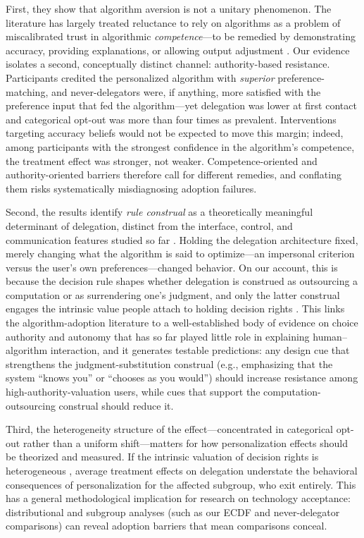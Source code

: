 \documentclass[a4paper, 12pt, fleqn]{article}
\theoremstyle{definition}
\newcommand{\inew}[1]{{\color{blue} #1\color{black}}}
\begin{document}
\inew{First, they show that algorithm aversion is not a unitary phenomenon. The literature has largely treated reluctance to rely on algorithms as a problem of miscalibrated trust in algorithmic \emph{competence}---to be remedied by demonstrating accuracy, providing explanations, or allowing output adjustment \citep{Dietvorst2018,Yeomans2019,Leichtmann2023}. Our evidence isolates a second, conceptually distinct channel: authority-based resistance. Participants credited the personalized algorithm with \emph{superior} preference-matching, and never-delegators were, if anything, more satisfied with the preference input that fed the algorithm---yet delegation was lower at first contact and categorical opt-out was more than four times as prevalent. Interventions targeting accuracy beliefs would not be expected to move this margin; indeed, among participants with the strongest confidence in the algorithm's competence, the treatment effect was stronger, not weaker. Competence-oriented and authority-oriented barriers therefore call for different remedies, and conflating them risks systematically misdiagnosing adoption failures.}

\inew{Second, the results identify \emph{rule construal} as a theoretically meaningful determinant of delegation, distinct from the interface, control, and communication features studied so far \citep{Dietvorst2018,Hildebrand2021,Fink2024}. Holding the delegation architecture fixed, merely changing what the algorithm is said to optimize---an impersonal criterion versus the user's own preferences---changed behavior. On our account, this is because the decision rule shapes whether delegation is construed as outsourcing a computation or as surrendering one's judgment, and only the latter construal engages the intrinsic value people attach to holding decision rights \citep{Bartling2014,Owens2014,FreyBenzStutzer2004}. This links the algorithm-adoption literature to a well-established body of evidence on choice authority and autonomy \citep{Brehm1966,DeciRyan2000,Leotti2010} that has so far played little role in explaining human--algorithm interaction, and it generates testable predictions: any design cue that strengthens the judgment-substitution construal (e.g., emphasizing that the system ``knows you'' or ``chooses as you would'') should increase resistance among high-authority-valuation users, while cues that support the computation-outsourcing construal should reduce it.}

\inew{Third, the heterogeneity structure of the effect---concentrated in categorical opt-out rather than a uniform shift---matters for how personalization effects should be theorized and measured. If the intrinsic valuation of decision rights is heterogeneous \citep{Bartling2014,Owens2014}, average treatment effects on delegation understate the behavioral consequences of personalization for the affected subgroup, who exit entirely. This has a general methodological implication for research on technology acceptance: distributional and subgroup analyses (such as our ECDF and never-delegator comparisons) can reveal adoption barriers that mean comparisons conceal.}
\end{document}
